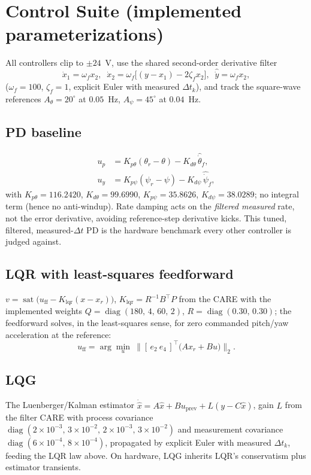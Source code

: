 \documentclass[conference]{IEEEtran}
\newcommand{\sat}{\operatorname{sat}}
\newcommand{\diag}{\operatorname{diag}}
\begin{document}
\section{Control Suite (implemented parameterizations)}\label{sec:control}
All controllers clip to $\pm24$~V, use the shared second-order derivative filter
\begin{equation}
\dot x_1 = \omega_f x_2,\;\;
\dot x_2 = \omega_f\bigl[(y - x_1) - 2\zeta_f x_2\bigr],\;\;
\hat{\dot y} = \omega_f x_2,
\label{eq:filt}
\end{equation}
($\omega_f = 100$, $\zeta_f = 1$, explicit Euler with measured $\Delta t_k$), and track the square-wave references $A_\theta = 20^\circ$ at $0.05$~Hz, $A_\psi = 45^\circ$ at $0.04$~Hz.

\subsection{PD baseline}
\begin{align}
u_p &= K_{p\theta}(\theta_r - \theta) - K_{d\theta}\,\hat{\dot\theta}_f,\nonumber\\
u_y &= K_{p\psi}(\psi_r - \psi) - K_{d\psi}\,\hat{\dot\psi}_f,
\end{align}
with $K_{p\theta} = 116.2420$, $K_{d\theta} = 99.6990$, $K_{p\psi} = 35.8626$, $K_{d\psi} = 38.0289$; no integral term (hence no anti-windup). Rate damping acts on the \emph{filtered measured} rate, not the error derivative, avoiding reference-step derivative kicks. This tuned, filtered, measured-$\Delta t$ PD is the hardware benchmark every other controller is judged against.

\subsection{LQR with least-squares feedforward}
$v = \sat\bigl(u_{\mathrm{ff}} - K_{\mathrm{lqr}}(x - x_r)\bigr)$, $K_{\mathrm{lqr}} = R^{-1}B^{\!\top}P$ from the CARE with the implemented weights $Q = \diag(180,\,4,\,60,\,2)$, $R = \diag(0.30,\,0.30)$; the feedforward solves, in the least-squares sense, for zero commanded pitch/yaw acceleration at the reference:
\begin{equation}
u_{\mathrm{ff}} = \arg\min_u\ \bigl\| [\,e_2\ e_4\,]^{\!\top}\!\bigl(A x_r + B u\bigr)\bigr\|_2 .
\end{equation}

\subsection{LQG}
The Luenberger/Kalman estimator
$\dot{\hat x} = A\hat x + Bu_{\mathrm{prev}} + L(y - C\hat x)$, gain $L$ from the filter CARE with process covariance $\diag(2{\times}10^{-3},\,3{\times}10^{-2},\,2{\times}10^{-3},\,3{\times}10^{-2})$ and measurement covariance $\diag(6{\times}10^{-4},\,8{\times}10^{-4})$, propagated by explicit Euler with measured $\Delta t_k$, feeding the LQR law above. On hardware, LQG inherits LQR's conservatism plus estimator transients.
\end{document}
